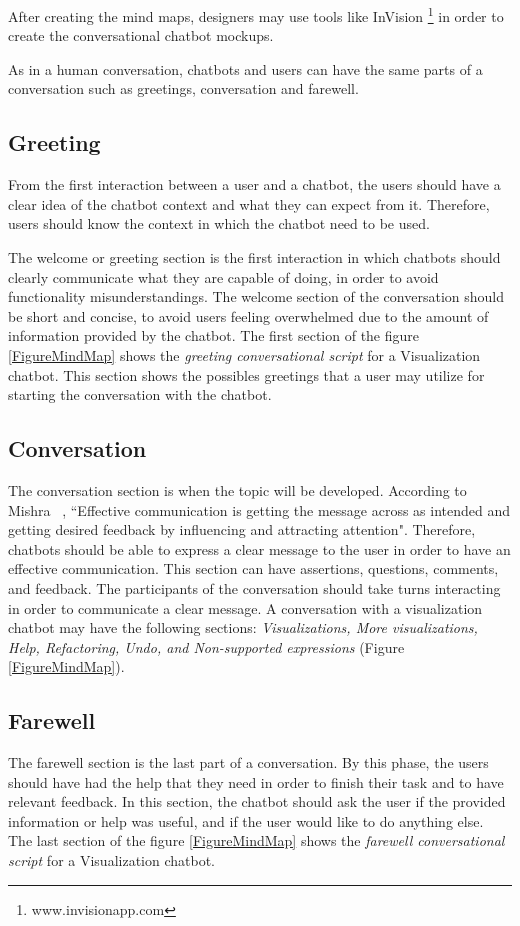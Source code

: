 \documentclass[a4paper,10pt]{article}
\begin{document}
After creating the mind maps, designers may use tools like InVision \footnote{www.invisionapp.com} in order to create the conversational chatbot mockups.

As in a human conversation, chatbots and users can have the same parts of a conversation such as greetings,  conversation and farewell.

\subsection{Greeting}
From the first interaction between a user and a chatbot, the users should have a clear idea of the chatbot context and what they can expect from it. Therefore, users should know the context in which the chatbot need to be used.

The welcome or greeting section is the first interaction in which chatbots should clearly communicate what they are capable of doing, in order to avoid functionality misunderstandings. 
The welcome section of the conversation should be short and concise, to avoid users feeling overwhelmed due to the amount of information provided by the chatbot. The first section of the figure \ref{FigureMindMap} shows the \textit{greeting conversational script} for a Visualization chatbot. This section shows the possibles greetings that a user may utilize for starting the conversation with the chatbot.  

\subsection{Conversation}
The conversation section is when the topic will be developed. According to Mishra ~\cite{effectivCommunication}, ``Effective communication is getting the message across as intended and getting desired feedback by influencing and attracting attention". Therefore, chatbots should be able to express a clear message to the user in order to have an effective communication. This section can have assertions, questions, comments, and feedback. The participants of the conversation should take turns interacting in order to communicate a clear message. A conversation with a visualization chatbot may have the following sections: \textit{Visualizations, More visualizations, Help, Refactoring, Undo, and Non-supported expressions} (Figure \ref{FigureMindMap}).

\subsection{Farewell}
The farewell section is the last part of a conversation. By this phase, the users should have had the help that they need in order to finish their task and to have relevant feedback. In this section, the chatbot should ask the user if the provided information or help was useful, and if the user would like to do anything else. The last section of the figure \ref{FigureMindMap} shows the \textit{farewell conversational script} for a Visualization chatbot. 
\end{document}
